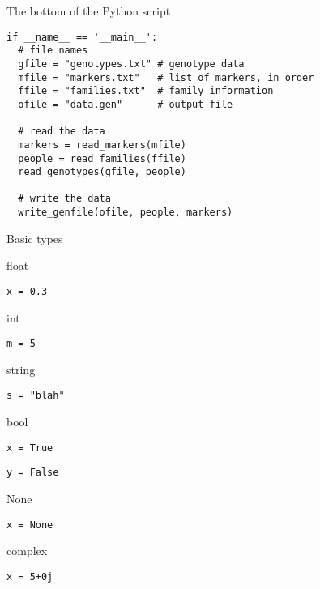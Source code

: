 \documentclass[12pt,t]{beamer}
\begin{document}
\begin{frame}[fragile]{The bottom of the Python script}

\vspace{18pt}

\begin{lstlisting}
if __name__ == '__main__':
  # file names
  gfile = "genotypes.txt" # genotype data
  mfile = "markers.txt"   # list of markers, in order
  ffile = "families.txt"  # family information
  ofile = "data.gen"      # output file

  # read the data
  markers = read_markers(mfile)
  people = read_families(ffile)
  read_genotypes(gfile, people)

  # write the data
  write_genfile(ofile, people, markers)
\end{lstlisting}

\end{frame}



\begin{frame}{Basic types}

\bbi
\item float
  \bi
  \item[] {\tt x = 0.3}
  \ei
\item int
  \bi
  \item[] {\tt m = 5}
  \ei
\item string
  \bi
  \item[] {\tt s = "blah"}
  \ei
\item bool
  \bi
  \item[] {\tt x = True}
  \item[] {\tt y = False}
  \ei
\item None
  \bi
  \item[] {\tt x = None}
  \ei
\item complex
  \bi
  \item[] {\tt x = 5+0j}
  \ei
\ei

\end{frame}
\end{document}
